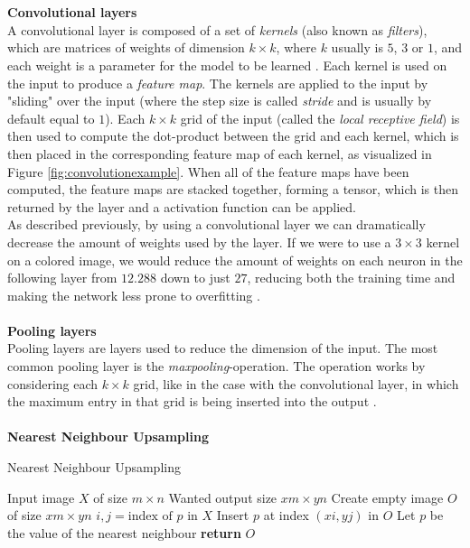 \documentclass[./main.tex]{subfiles}
\begin{document}
\\
\\
\textbf{Convolutional layers} \\
A convolutional layer is composed of a set of \textit{kernels} (also known as \textit{filters}), which are matrices of weights of dimension $k \times k$, where $k$ usually is $5$, $3$ or $1$, and each weight is a parameter for the model to be learned \cite{Everything}. Each kernel is used on the input to produce a \textit{feature map}. The kernels are applied to the input by "sliding" over the input (where the step size is called \textit{stride} and is usually by default equal to $1$). Each $k \times k$ grid of the input (called the \textit{local receptive field}) is then used to compute the dot-product between the grid and each kernel, which is then placed in the corresponding feature map of each kernel, as visualized in Figure \ref{fig:convolutionexample}. When all of the feature maps have been computed, the feature maps are stacked together, forming a tensor, which is then returned by the layer and a activation function can be applied. \\
As described previously, by using a convolutional layer we can dramatically decrease the amount of weights used by the layer. If we were to use a $3 \times 3$ kernel on a colored image, we would reduce the amount of weights on each neuron in the following layer from $12.288$ down to just $27$, reducing both the training time and making the network less prone to overfitting \cite{CNN}.
\\
\\
\textbf{Pooling layers} \\
Pooling layers are layers used to reduce the dimension of the input. The most common pooling layer is the \textit{maxpooling}-operation. The operation works by considering each $k \times k$ grid, like in the case with the convolutional layer, in which the maximum entry in that grid is being inserted into the output \cite{CNN}.
\\
\\
\textbf{Nearest Neighbour Upsampling} \\
\begin{algorithm}[htbp]
    \caption{Nearest Neighbour Upsampling \cite{NNUpsampling}}
    \label{Algorithm:NNUpsampling}
    \begin{algorithmic}[1]
        \Require Input image $X$ of size $m \times n$
        \Require Wanted output size $xm \times yn$
        \State Create empty image $O$ of size $xm \times yn$
            \State $i,j = \text{index of } p \text{ in } X$
            \State Insert $p$ at index $(xi, yj)$ in $O$
        \EndFor
            \State Let $p$ be the value of the nearest neighbour
        \EndFor
        \State \textbf{return} $O$
    \end{algorithmic}
\end{algorithm}
\end{document}
